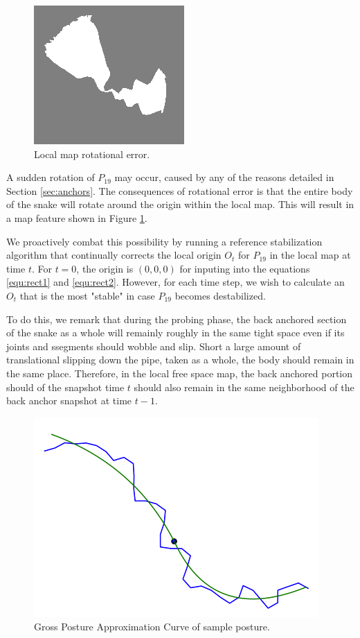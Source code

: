 \begin{figure}
  \begin{center}
    \includegraphics[scale=1.0]{localMapError.png}
  \end{center}
  \caption{Local map rotational error.}
	\label{ref_rot_error}
\end{figure}

A sudden rotation of $P_{19}$ may occur, caused by any of the reasons detailed in Section \ref{sec:anchors}.  The consequences of rotational error is that the entire body of the snake will rotate around the origin within the local map.  This will result in a map feature shown in Figure \ref{ref_rot_error}.

We proactively combat this possibility by running a reference stabilization algorithm that continually corrects the local origin $O_t$ for $P_{19}$ in the local map at time $t$.  For $t=0$, the origin is $(0,0,0)$ for inputing into the equations \ref{equ:rect1} and \ref{equ:rect2}.  However, for each time step, we wish to calculate an $O_t$ that is the most "stable" in case $P_{19}$ becomes destabilized.

To do this, we remark that during the probing phase, the back anchored section of the snake as a whole will remainly roughly in the same tight space even if its joints and ssegments should wobble and slip.  Short a large amount of translational slipping down the pipe, taken as a whole, the body should remain in the same place.  Therefore, in the local free space map, the back anchored portion should of the snapshot time $t$ should also remain in the same neighborhood of the back anchor snapshot at time $t-1$.  

\begin{figure}
  \begin{center}
    \includegraphics[scale=1.0]{plotGPAC0059.png}
  \end{center}
  \caption{Gross Posture Approximation Curve of sample posture.}
	\label{ref_gpac}
\end{figure}

